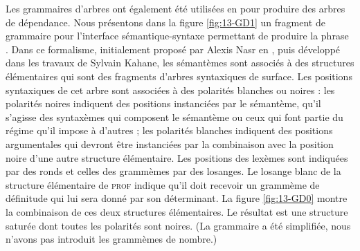 {Les grammaires d’arbres ont également été utilisées en  pour produire des arbres de dépendance. Nous présentons dans la figure \ref{fig:13-GD1} un fragment de grammaire pour l’interface sémantique-syntaxe permettant de produire la phrase . Dans ce formalisme, initialement proposé par Alexis Nasr en \citeyear{nasr1995formalism}, puis développé dans les travaux de Sylvain Kahane, les sémantèmes sont associés à des structures élémentaires qui sont des fragments d’arbres syntaxiques de surface. Les positions syntaxiques de cet arbre sont associées à des polarités blanches ou noires : les polarités noires indiquent des positions instanciées par le sémantème, qu’il s’agisse des syntaxèmes qui composent le sémantème ou ceux qui font partie du régime qu’il impose à d’autres ; les polarités blanches indiquent des positions argumentales qui devront être instanciées par la combinaison avec la position noire d’une autre structure élémentaire. Les positions des lexèmes sont indiquées par des ronds et celles des grammèmes par des losanges. Le losange blanc de la structure élémentaire de \textsc{prof} indique qu’il doit recevoir un grammème de définitude qui lui sera donné par son déterminant. La figure \ref{fig:13-GD0} montre la combinaison de ces deux structures élémentaires. Le résultat est une structure saturée dont toutes les polarités sont noires. (La grammaire a été simplifiée, nous n’avons pas introduit les grammèmes de nombre.)

\begin{figure}[H]
%
\hspace{0.3cm}\hspace{0.3cm}%
\end{figure}}
